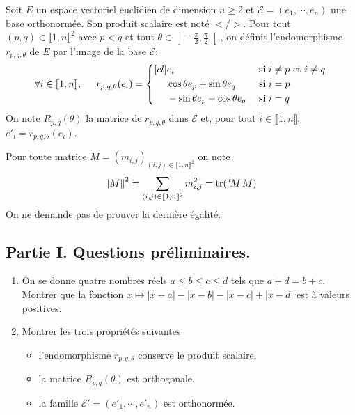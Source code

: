 Soit $E$ un espace vectoriel euclidien de dimension $n\geq 2$ et $\mathcal{E}=(e_1,\cdots,e_n)$ une base orthonormée. Son produit scalaire est noté $< / >$.\newline
Pour tout $(p,q)\in \llbracket 1,n \rrbracket^2$ avec $p < q$ et tout $\theta \in \left] -\frac{\pi}{2} , \frac{\pi}{2}\right[$, on définit l'endomorphisme $r_{p,q,\theta}$ de $E$ par l'image de la base $\mathcal{E}$:
\begin{displaymath}
 \forall i \in \llbracket 1,n \rrbracket, \hspace{0.5cm}
r_{p,q,\theta}(e_i) = 
\left\lbrace 
\begin{aligned}[cl]
 &e_i &\text{ si }& i\neq p \text{ et } i\neq q \\
 &\cos \theta e_p + \sin \theta e_q &\text{ si }& i = p\\
 &-\sin \theta e_p + \cos \theta e_q &\text{ si }& i = q
\end{aligned}
\right. 
\end{displaymath}
On note $R_{p,q}(\theta)$ la matrice de $r_{p,q,\theta}$ dans $\mathcal{E}$ et, pour tout $i\in \llbracket1,n \rrbracket$, $e'_i = r_{p,q,\theta}(e_i)$.

Pour toute matrice $M=\left( m_{i,j}\right)_{(i,j)\in \llbracket 1,n \rrbracket^2}$ on note 
\begin{displaymath}
 \left\|M\right\|^2 = \sum_{(i,j)\in \llbracket 1,n \rrbracket^2}m_{i,j}^2 = \operatorname{tr}(\,\mathstrut^t\! M \, M)
\end{displaymath}
On ne demande pas de prouver la dernière égalité.

\subsection*{Partie I. Questions préliminaires.}
\begin{enumerate}
 \item On se donne quatre nombres réels $a \leq b \leq c \leq d$ tels que $a + d = b + c$. Montrer que la fonction
$x \mapsto |x-a| - |x-b| - |x-c| + |x-d|$ est à valeurs positives.
 \item Montrer les trois propriétés suivantes
\begin{itemize}
 \item l'endomorphisme $r_{p,q,\theta}$ conserve le produit scalaire,
 \item la matrice $R_{p,q}(\theta)$ est orthogonale,
 \item la famille $\mathcal{E}'=(e'_1,\cdots,e'_n)$ est orthonormée.
\end{itemize}

\end{enumerate}


